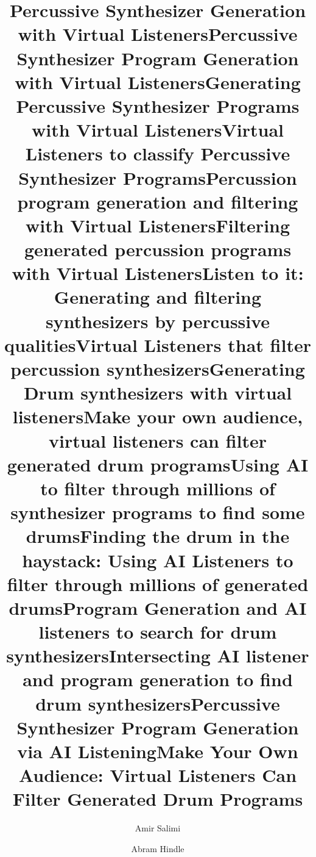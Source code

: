 \documentclass[runningheads,a4paper]{llncs}
\begin{document}
\mainmatter  

\title{Percussive Synthesizer Generation with Virtual Listeners}
\title{Percussive Synthesizer Program Generation with Virtual Listeners}
\title{Generating Percussive Synthesizer Programs with Virtual Listeners}
\title{Virtual Listeners to classify Percussive Synthesizer Programs}
\title{Percussion program generation and filtering with Virtual Listeners}
\title{Filtering generated percussion programs with Virtual Listeners}
\title{Listen to it: Generating and filtering synthesizers by percussive qualities}
\title{Virtual Listeners that filter percussion synthesizers}
\title{Generating Drum synthesizers with virtual listeners}
\title{Make your own audience, virtual listeners can filter generated drum programs}
\title{Using AI to filter through millions of synthesizer programs to find some drums}
\title{Finding the drum in the haystack: Using AI Listeners to filter through millions of generated drums}
\title{Program Generation and AI listeners to search for drum synthesizers}
\title{Intersecting AI listener and program generation to find drum synthesizers}
\title{Percussive Synthesizer Program Generation via AI Listening}
\title{Make Your Own Audience: Virtual Listeners Can Filter Generated Drum Programs}



\author{Amir Salimi \and Abram Hindle}



\maketitle
\end{document}

